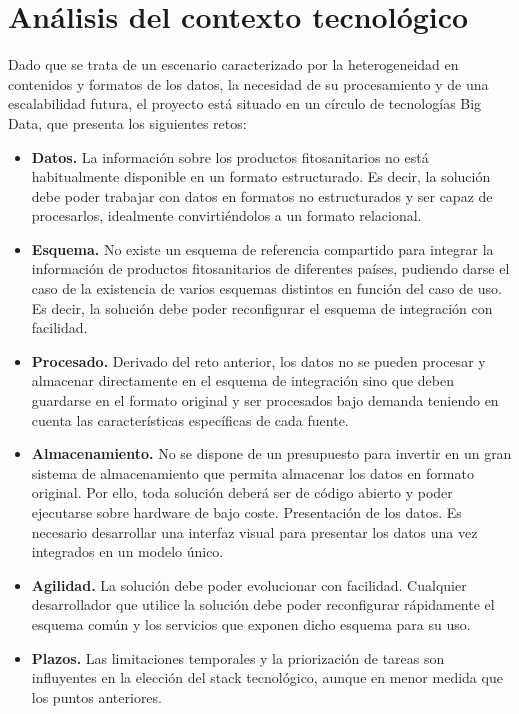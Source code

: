 \section{Análisis del contexto tecnológico}
Dado que se trata de un escenario caracterizado por la heterogeneidad en contenidos y formatos de los datos, la necesidad de su procesamiento y de una escalabilidad futura, el proyecto está situado en un círculo de tecnologías Big Data, que presenta los siguientes retos:
\begin{itemize}
\item \textbf{Datos.} La información sobre los productos fitosanitarios no está habitualmente disponible en un formato estructurado. Es decir, la solución debe poder trabajar con datos en formatos no estructurados y ser capaz de procesarlos, idealmente convirtiéndolos a un formato relacional.
\item \textbf{Esquema.} No existe un esquema de referencia compartido para integrar la información de productos fitosanitarios de diferentes países, pudiendo darse el caso de la existencia de varios esquemas distintos en función del caso de uso. Es decir, la solución debe poder reconfigurar el esquema de integración con facilidad.
\item \textbf{Procesado.} Derivado del reto anterior, los datos no se pueden procesar y almacenar directamente en el esquema de integración sino que  deben guardarse en el formato original y ser procesados bajo demanda teniendo en cuenta las características específicas de cada fuente.
\item \textbf{Almacenamiento.} No se dispone de un presupuesto para invertir en un gran sistema de almacenamiento que permita almacenar los datos en formato original. Por ello, toda solución deberá ser de código abierto y poder ejecutarse sobre hardware de bajo coste.
Presentación de los datos. Es necesario desarrollar una interfaz visual para presentar los datos una vez integrados en un modelo único. 
\item  \textbf{Agilidad.} La solución debe poder evolucionar con facilidad. Cualquier desarrollador que utilice la solución debe poder reconfigurar rápidamente el esquema común y los servicios que exponen dicho esquema para su uso.
\item \textbf{Plazos.} Las limitaciones temporales y la priorización de tareas son influyentes en la elección del stack tecnológico, aunque en menor medida que los puntos anteriores. 
\end{itemize}

